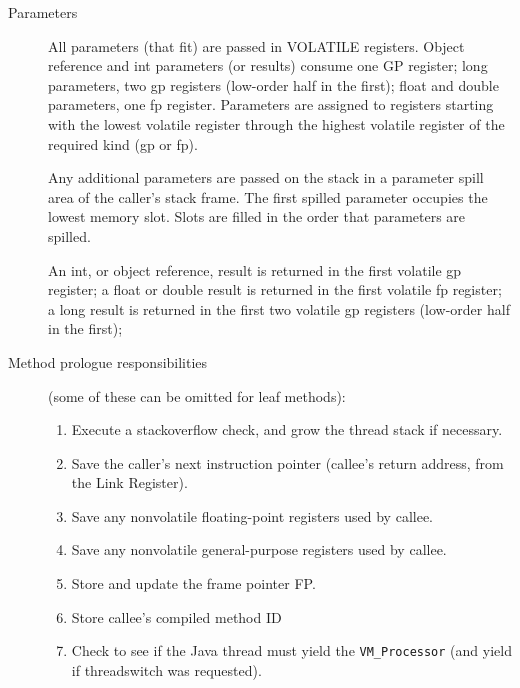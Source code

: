 \begin{description}
\item[Parameters]

    All parameters (that fit) are passed in VOLATILE registers.  Object
    reference and int parameters (or results) consume one GP register; long
    parameters, two gp registers (low-order half in the first);  float and
    double parameters, one fp register.  Parameters are 
    assigned to registers
    starting with the lowest volatile register through the highest volatile
    register of the required kind (gp or fp).

    Any additional parameters are passed on the stack in a parameter spill
    area of the caller's stack frame.  The first spilled parameter occupies
    the lowest memory slot.  Slots are filled in the order that parameters
    are spilled.

    An int, or object reference, result is returned in the first volatile
    gp register; a float or double result is returned in the first volatile
    fp register; a long result is returned in the first two volatile gp
    registers (low-order half in the first);

\item[Method prologue responsibilities] (some of these can be omitted for leaf
  methods):

\begin{enumerate}
\item Execute a stackoverflow check, and grow the thread stack if necessary.

\item Save the caller's next instruction pointer (callee's return address,
       from the Link Register).

\item Save any nonvolatile floating-point registers used by callee.

\item Save any nonvolatile general-purpose registers used by callee.

\item Store and update the frame pointer FP.

\item Store callee's compiled method ID 

\item Check to see if the Java\TMweb{} thread must yield the {\tt VM\_Processor}
(and yield if threadswitch was requested). 
\end{enumerate}


\end{description}
